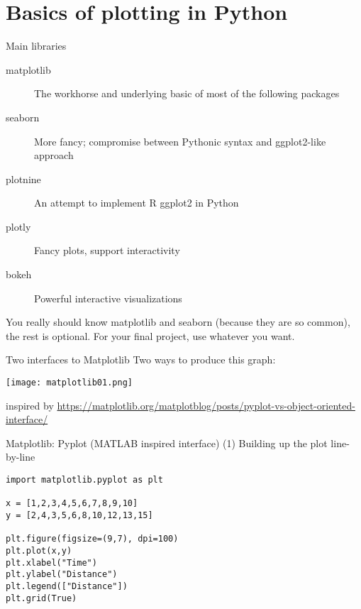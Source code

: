 \section{Basics of plotting in Python}



\begin{frame}{Main libraries}
  
\begin{description}
\item[matplotlib] The workhorse and underlying basic of most of the following packages
\item[seaborn] More fancy; compromise between Pythonic syntax and ggplot2-like approach
\item[plotnine] An attempt to implement R ggplot2 in Python
\item[plotly] Fancy plots, support interactivity
\item[bokeh] Powerful interactive visualizations
\end{description}

\pause

You really should know matplotlib and seaborn (because they are so common), the rest is optional. For your final project, use whatever you want.

\end{frame}




\begin{frame}[fragile]{Two interfaces to Matplotlib}
  Two ways to produce this graph:
  
  \centering
\texttt{[image: matplotlib01.png]}\hfill


\tiny inspired by \url{https://matplotlib.org/matplotblog/posts/pyplot-vs-object-oriented-interface/}


\end{frame}



\begin{frame}[fragile]{Matplotlib: Pyplot (MATLAB inspired interface)}
(1) Building up the plot line-by-line
  
\begin{verbatim}
import matplotlib.pyplot as plt

x = [1,2,3,4,5,6,7,8,9,10]
y = [2,4,3,5,6,8,10,12,13,15]

plt.figure(figsize=(9,7), dpi=100)
plt.plot(x,y)
plt.xlabel("Time")
plt.ylabel("Distance")
plt.legend(["Distance"])
plt.grid(True)
\end{verbatim}

 
\end{frame}


